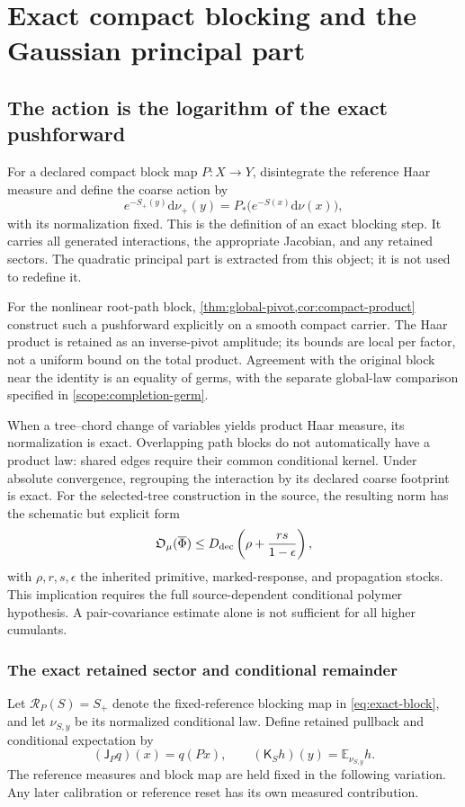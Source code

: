 \documentclass[11pt,oneside,openany]{book}
\theoremstyle{definition}
\theoremstyle{remark}
\newcommand{\E}{\mathbb E}
\newcommand{\dd}{\mathrm d}
\newcommand{\src}[2]{\cite[#2]{#1}}
\begin{document}
\chapter{Exact compact blocking and the Gaussian principal part}
\label{ch:blocking}
\section{The action is the logarithm of the exact pushforward}
For a declared compact block map $P:X\to Y$, disintegrate the reference Haar measure and define the coarse action by
\begin{equation}\label{eq:exact-block}
e^{-S_+(y)}\dd\nu_+(y)
=P_*\bigl(e^{-S(x)}\dd\nu(x)\bigr),
\end{equation}
with its normalization fixed. This is the definition of an exact blocking step. It carries all generated interactions, the appropriate Jacobian, and any retained sectors. The quadratic principal part is extracted from this object; it is not used to redefine it.

For the nonlinear root-path block, \cref{thm:global-pivot,cor:compact-product}
construct such a pushforward explicitly on a smooth compact carrier.
The Haar product is retained as an inverse-pivot amplitude; its bounds
are local per factor, not a uniform bound on the total product. Agreement
with the original block near the identity is an equality of germs, with
the separate global-law comparison specified in
\cref{scope:completion-germ}.

When a tree--chord change of variables yields product Haar measure, its normalization is exact. Overlapping path blocks do not automatically have a product law: shared edges require their common conditional kernel. Under absolute convergence, regrouping the interaction by its declared coarse footprint is exact. For the selected-tree construction in the source, the resulting norm has the schematic but explicit form
\begin{equation}\label{eq:selected-tree}
\mathfrak O_\mu(\overline\Phi)
\le D_{\rm dec}\left(\rho+\frac{rs}{1-\epsilon}\right),
\end{equation}
with $\rho,r,s,\epsilon$ the inherited primitive, marked-response, and propagation stocks. This implication requires the full source-dependent conditional polymer hypothesis. A pair-covariance estimate alone is not sufficient for all higher cumulants. \src{F7}{V92--V94}

\subsection{The exact retained sector and conditional remainder}
Let $\mathcal R_P(S)=S_+$ denote the fixed-reference blocking map in
\cref{eq:exact-block}, and let $\nu_{S,y}$ be its normalized conditional
law. Define retained pullback and conditional expectation by
\[
(\mathsf J_P q)(x)=q(Px),\qquad
(\mathsf K_S h)(y)=\E_{\nu_{S,y}}h.
\]
The reference measures and block map are held fixed in the following
variation. Any later calibration or reference reset has its own
measured contribution.
\end{document}
